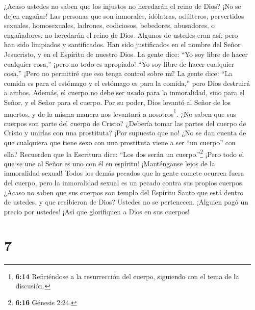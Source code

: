  ¿Acaso ustedes no saben que los injustos no heredarán el
reino de Dios? ¡No se dejen engañar! Las personas que son inmorales,
idólatras, adúlteros, pervertidos sexuales, homosexuales, 
ladrones, codiciosos, bebedores, abusadores, o engañadores, no heredarán
el reino de Dios.  Algunos de ustedes eran así, pero han
sido limpiados y santificados. Han sido justificados en el nombre del
Señor Jesucristo, y en el Espíritu de nuestro Dios.  La
gente dice: ``Yo soy libre de hacer cualquier cosa,'' ¡pero no todo es
apropiado! ``Yo soy libre de hacer cualquier cosa,'' ¡Pero no permitiré
que eso tenga control sobre mí! La gente dice:  ``La comida
es para el estómago y el estómago es para la comida,'' pero Dios
destruirá a ambos. Además, el cuerpo no debe ser usado para la
inmoralidad, sino para el Señor, y el Señor para el cuerpo.
 Por su poder, Dios levantó al Señor de los muertos, y de
la misma manera nos levantará a nosotros\footnote{\textbf{6:14}
  Refiriéndose a la resurrección del cuerpo, siguiendo con el tema de la
  discusión.}.  ¿No saben que sus cuerpos son parte del
cuerpo de Cristo? ¿Debería tomar las partes del cuerpo de Cristo y
unirlas con una prostituta? ¡Por supuesto que no!  ¿No se
dan cuenta de que cualquiera que tiene sexo con una prostituta viene a
ser ``un cuerpo'' con ella? Recuerden que la Escritura dice: ``Los dos
serán un cuerpo.''\footnote{\textbf{6:16} Génesis 2:24.} 
¡Pero todo el que se une al Señor es uno con él en espíritu!
 ¡Manténganse lejos de la inmoralidad sexual! Todos los
demás pecados que la gente comete ocurren fuera del cuerpo, pero la
inmoralidad sexual es un pecado contra sus propios cuerpos.
 ¿Acaso no saben que sus cuerpos son templo del Espíritu
Santo que está dentro de ustedes, y que recibieron de Dios?
 Ustedes no se pertenecen. ¡Alguien pagó un precio por
ustedes! ¡Así que glorifiquen a Dios en sus cuerpos!

\hypertarget{section-6}{%
\section{7}\label{section-6}}

